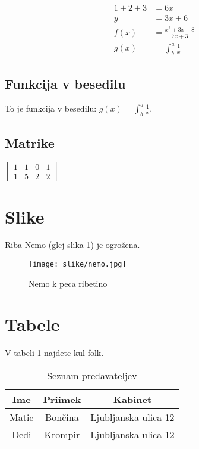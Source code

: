 \documentclass{article}
\begin{document}
\begin{align*}
    1+2+3 &= 6x\\
    y &= 3x + 6\\ %
    f(x) &= \frac{x^2 + 3x + 8}{7x + 3}\\ %
    g(x) &= \int^a_b \frac{1}{x}    
\end{align*}

\subsection{Funkcija v besedilu}
To je funkcija v besedilu: $g(x) = \int^a_b
\frac{1}{x}$.

\subsection{Matrike}
$ 
\left[
\begin{matrix}
    1 & 1 & 0 & 1\\
    1 & 5 & 2 & 2
\end{matrix}
\right]
$

\newpage
\section{Slike}
Riba Nemo (glej slika \ref{fig:nemo}) je ogrožena.
\begin{figure}[h] %
    \centering
    \texttt{[image: slike/nemo.jpg]}
    \caption{Nemo k peca ribetino}
    \label{fig:nemo}
\end{figure}

\section{Tabele}
V tabeli \ref{tab:seznam} najdete kul folk.
\begin{table}[h]
    \centering
    \begin{tabular}{c c|c}
        \hline
         \textbf{Ime} & \textbf{Priimek} & \textbf{Kabinet}\\
         \hline \hline
         Matic & Bončina & Ljubljanska ulica 12 \\
         Dedi & Krompir & Ljubljanska ulica 12
    \end{tabular}
    \caption{Seznam predavateljev}
    \label{tab:seznam}
\end{table}
\end{document}
